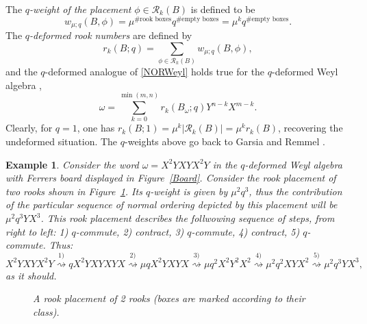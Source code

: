 \documentclass[10pt]{amsart}
\newtheorem{example}[theorem]{Example}%
\begin{document}
The {\em $q$-weight of the placement} $\phi \in \mathcal{R}_k(B)$ is defined to be 
\begin{equation}
w_{\mu;q}(B,\phi)=\mu^{\# \mbox{rook boxes}} q^{\# \mbox{empty boxes}}=\mu^{k} q^{\# \mbox{empty boxes}}.
\end{equation}
The {\em $q$-deformed rook numbers} are defined by 
\begin{equation}
r_k(B;q)=\sum_{\phi \in \mathcal{R}_k(B)} w_{\mu;q}(B,\phi),
\end{equation}
and the $q$-deformed analogue of \eqref{NORWeyl} holds true for the $q$-deformed Weyl algebra \cite{AV2005}, 
\begin{equation}\label{NORQWeyl}
\omega=\sum_{k=0}^{\min(m,n)} r_k(B_{\omega};q) Y^{n-k}X^{m-k}.
\end{equation}
Clearly, for $q=1$, one has $r_k(B;1)=\mu^k |\mathcal{R}_k(B)|=\mu^k r_k(B)$, recovering the undeformed situation. The $q$-weights above go back to Garsia and Remmel \cite{GR1986}.
\begin{example}\label{ExampleNOWeyl}
Consider the word $\omega = X^2YXYX^2Y$ in the $q$-deformed Weyl algebra with Ferrers board displayed in Figure~\ref{Board}. Consider the rook placement of two rooks shown in Figure~\ref{RookPl}. Its $q$-weight is given by $ \mu^2 q^3$, thus the contribution of the particular sequence of normal ordering depicted by this placement will be $\mu^2 q^3 YX^{3}$. This rook placement describes the follwowing sequence of steps, from right to left: 1) $q$-commute, 2) contract, 3) $q$-commute, 4) contract, 5) $q$-commute. Thus:
$$
X^2YXYX^2Y \overset{1)}\rightsquigarrow q X^2YXYXYX \overset{2)}\rightsquigarrow \mu q X^2YXYX \overset{3)}\rightsquigarrow \mu q^2 X^2Y^2X^2  \overset{4)}\rightsquigarrow \mu^2 q^2 XYX^2 \overset{5)}\rightsquigarrow \mu^2 q^3 YX^3, 
$$    
as it should.
\begin{figure}[h]
\centering
{}
\caption{A rook placement of 2 rooks (boxes are marked according to their class).}\label{RookPl}
\end{figure}
\end{example}
\end{document}
